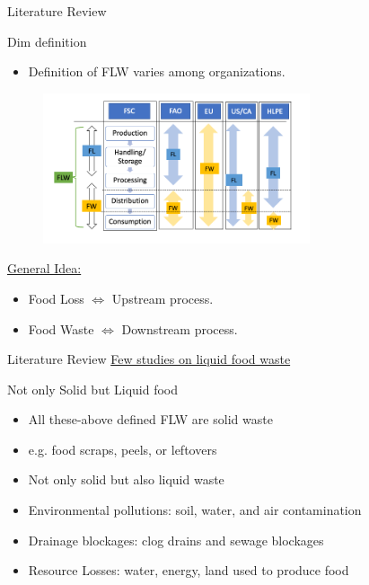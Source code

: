 \documentclass{beamer}
\begin{document}
\begin{frame}{Literature Review}
     \begin{block}{Dim definition}
        \begin{itemize}
            \item Definition of FLW varies among organizations.
        \end{itemize}
        \begin{figure}
            \centering
            \includegraphics[width=0.7\textwidth,height=0.7\textheight,keepaspectratio]{defnFLW.png}
        \end{figure}
     \end{block}
     \underline{General Idea:}
     \begin{itemize}
        \item Food Loss  $\Longleftrightarrow$ Upstream process.
        \item Food Waste $\Longleftrightarrow$ Downstream process.
    \end{itemize}  
\end{frame}


\begin{frame}{Literature Review}
    \underline{Few studies on liquid food waste}
    
    \begin{block}{Not only Solid but Liquid food}       
        \begin{itemize}
            \item All these-above defined FLW are solid waste
            \item e.g. food scraps, peels, or leftovers
            \item Not only solid but also liquid waste
            \item Environmental pollutions: soil, water, and air contamination
            \item Drainage blockages: clog drains and sewage blockages
            \item Resource Losses: water, energy, land used to produce food
        \end{itemize}
    \end{block}
\end{frame}
\end{document}
